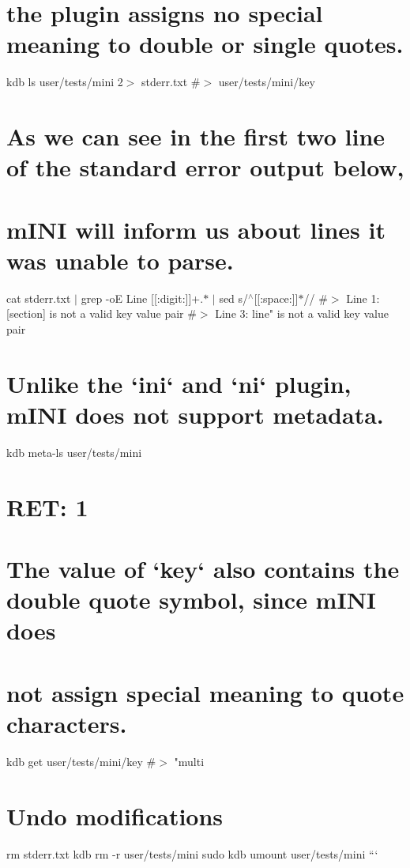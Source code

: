 \hypertarget{autotoc_md404_autotoc_md423}{}\section{the plugin assigns no special meaning to double or single quotes.}\label{autotoc_md404_autotoc_md423}
kdb ls user/tests/mini 2$>$ stderr.\+txt \#$>$ user/tests/mini/key\hypertarget{autotoc_md404_autotoc_md424}{}\section{As we can see in the first two line of the standard error output below,}\label{autotoc_md404_autotoc_md424}
\hypertarget{autotoc_md404_autotoc_md425}{}\section{m\+I\+N\+I will inform us about lines it was unable to parse.}\label{autotoc_md404_autotoc_md425}
cat stderr.\+txt $\vert$ grep -\/oE \textquotesingle{}Line \mbox{[}\mbox{[}\+:digit\+:\mbox{]}\mbox{]}+.$\ast$\textquotesingle{} $\vert$ sed \textquotesingle{}s/$^\wedge$\mbox{[}\mbox{[}\+:space\+:\mbox{]}\mbox{]}$\ast$//\textquotesingle{} \#$>$ Line 1\+: \textquotesingle{}\mbox{[}section\mbox{]}\textquotesingle{} is not a valid key value pair \#$>$ Line 3\+: \textquotesingle{}line"\textquotesingle{} is not a valid key value pair\hypertarget{autotoc_md404_autotoc_md426}{}\section{Unlike the `ini` and `ni` plugin, m\+I\+N\+I does not support metadata.}\label{autotoc_md404_autotoc_md426}
kdb meta-\/ls user/tests/mini \hypertarget{autotoc_md404_autotoc_md427}{}\section{R\+E\+T\+: 1}\label{autotoc_md404_autotoc_md427}
\hypertarget{autotoc_md404_autotoc_md428}{}\section{The value of `key` also contains the double quote symbol, since m\+I\+N\+I does}\label{autotoc_md404_autotoc_md428}
\hypertarget{autotoc_md404_autotoc_md429}{}\section{not assign special meaning to quote characters.}\label{autotoc_md404_autotoc_md429}
kdb get user/tests/mini/key \#$>$ "multi\hypertarget{autotoc_md404_autotoc_md430}{}\section{Undo modifications}\label{autotoc_md404_autotoc_md430}
rm stderr.\+txt kdb rm -\/r user/tests/mini sudo kdb umount user/tests/mini ``` 